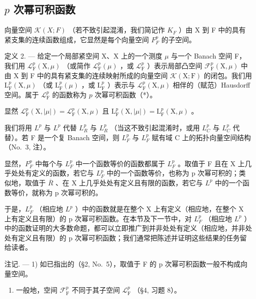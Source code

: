 \subsection{\texorpdfstring{\(p\) 次幂可积函数}{p 次幂可积函数}}

向量空间 \(\mathcal{K}(X;F)\) （若不致引起混淆，我们简记作 \(K_{F}\) ）由 X 到 F 中的具有紧支集的连续函数组成，它显然是每个向量空间 \(F_{F}^{p}\) 的子空间。

定义 2. --- 给定一个局部紧空间 X、X 上的一个测度 \(\mu\) 与一个 Banach 空间 F，我们用 \(\mathcal{L}_{\mathrm{F}}^{p}(\mathrm{X},\mu)\) （或简作 \(\mathcal{L}_{\mathrm{F}}^{p}(\mu)\) ，或 \(\mathcal{L}_{\mathrm{F}}^{p}\) ）表示局部凸空间 \(\mathcal{F}_{\mathrm{F}}^{p}(\mathrm{X},\mu)\) 中由 X 到 F 中的具有紧支集的连续映射所成的向量空间 \(\mathcal{K}(\mathrm{X};\mathrm{F})\) 的闭包。我们用 \(\mathrm{L}_{\mathrm{F}}^{p}(\mathrm{X},\mu)\) （或 \(\mathrm{L}_{\mathrm{F}}^{p}(\mu)\) ，或 \(\mathrm{L}_{\mathrm{F}}^{p}\) ）表示与 \(\mathcal{L}_{\mathrm{F}}^{p}(\mathrm{X},\mu)\) 相伴的（赋范）Hausdorff 空间。属于 \(\mathcal{L}_{\mathrm{F}}^{p}\) 的函数称为 \(p\) 次幂可积函数（*）。

显然 \(\mathcal{L}_{\mathrm{F}}^{p}(\mathrm{X},|\mu |) = \mathcal{L}_{\mathrm{F}}^{p}(\mathrm{X},\mu)\) 且 \(\mathrm{L}_{\mathrm{F}}^{p}(\mathrm{X},|\mu |) = \mathrm{L}_{\mathrm{F}}^{p}(\mathrm{X},\mu)\) 。

我们将用 \(L^{p}\) 与 \(L^{p}\) 代替 \(L_{R}^{p}\) 与 \(L_{R}^{p}\) （当这不致引起混淆时，或用 \(L_{C}^{p}\) 与 \(L_{C}^{p}\) 代替）。若 F 是一个复 Banach 空间，则 \(L_{F}^{p}\) 与 \(L_{F}^{p}\) 赋有域 C 上的拓扑向量空间结构（No.~3, 注）。

显然，\(F_{F}^{p}\) 中每个与 \(L_{F}^{p}\) 中一个函数等价的函数都属于 \(L_{F}^{p}\) 。取值于 F 且在 X 上几乎处处有定义的函数，若它与 \(L_{F}^{p}\) 中的一个函数等价，也称为 p 次幂可积的；类似地，取值于 \(\overline{R}\) 、在 X 上几乎处处有定义且有限的函数，若它与 \(L^{p}\) 中的一个函数等价，就称为 p 次幂可积的。

于是，\(L_{F}^{p}\) （相应地 \(L^{p}\) ）中的函数就是在整个 X 上有定义（相应地，在整个 X 上有定义且有限）的 p 次幂可积函数。在本节及下一节中，对 \(L_{F}^{p}\) （相应地 \(L^{p}\) ）中的函数证明的大多数命题，都可以立即推广到并非处处有定义（相应地，并非处处有定义且有限）的 p 次幂可积函数；我们通常把陈述并证明这些结果的任务留给读者。

注记. --- 1) 如已指出的（§2, No.~5），取值于 F 的 p 次幂可积函数一般不构成向量空间。

\begin{enumerate}
\def\labelenumi{\arabic{enumi})}
\setcounter{enumi}{1}
\tightlist
\item
  一般地，空间 \(\mathcal{F}_{\mathrm{F}}^{p}\) 不同于其子空间 \(\mathcal{L}_{\mathrm{F}}^{p}\) （§4, 习题 8）。
\end{enumerate}

